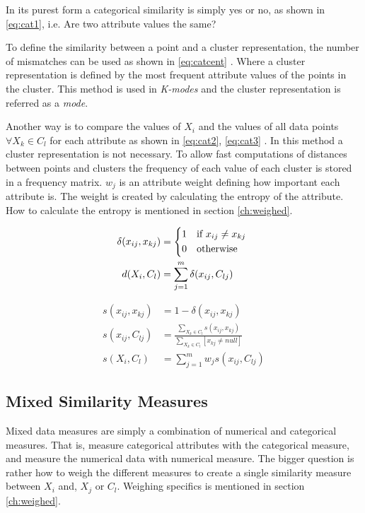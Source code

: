 \documentclass[../report.tex]{subfiles}
\begin{document}
In its purest form a categorical similarity is simply yes or no, as shown in \ref{eq:cat1}, i.e. Are two attribute values the same? \cite{Guha2000, Kaufman1990}

To define the similarity between a point and a cluster representation, the number of mismatches can be used as shown in \ref{eq:catcent} \cite{Ng1999,Huang97clusteringlarge}. Where a cluster representation is defined by the most frequent attribute values of the points in the cluster. This method is used in \textit{K-modes} and the cluster representation is referred as a \textit{mode}.

Another way is to compare the values of $X_i$ and the values of all data points $\forall X_k \in C_l$ for each attribute as shown in \ref{eq:cat2}, \ref{eq:cat3} \cite{Guha2000, Cheung2013}. In this method a cluster representation is not necessary. To allow fast computations of distances between points and clusters the frequency of each value of each cluster is stored in a frequency matrix. $w_j$ is an attribute weight defining how important each attribute is. The weight is created by calculating the entropy of the attribute. How to calculate the entropy is mentioned in section \ref{ch:weighed}.


\begin{align}
\label{eq:cat1}
\delta{(x_{ij},x_{kj})} &= 
  \begin{cases*}
  1 & if $x_{ij} \neq x_{kj}$ \\
    0 & otherwise
  \end{cases*} \\
\label{eq:catcent}
d(X_{i},C_l) &= \sum^{m}_{j=1}\delta(x_{ij},C_{lj})
\end{align}

\begin{align}
s(x_{ij},x_{kj}) &= 1 - \delta{(x_{ij},x_{kj})} \\
\label{eq:cat2}
s(x_{ij},C_{lj}) &= \frac{\sum_{X_k \in C_{l}}{s(x_{ij},x_{kj})}}{\sum_{X_k \in C_{l} }{[ x_{kj} \neq null ]}} \\
\label{eq:cat3}
s(X_{i},C_{l}) &= \sum_{j = 1}^{m}{w_j s(x_{ij},C_{lj})}
\end{align}

\subsection{Mixed Similarity Measures} \label{sssec:mixed-sim}
Mixed data measures are simply a combination of numerical and categorical measures. That is, measure categorical attributes with the categorical measure, and measure the numerical data with numerical measure. The bigger question is rather how to weigh the different measures to create a single similarity measure between $X_i$ and, $X_j$ or $C_l$. Weighing specifics is mentioned in section \ref{ch:weighed}.
\end{document}
